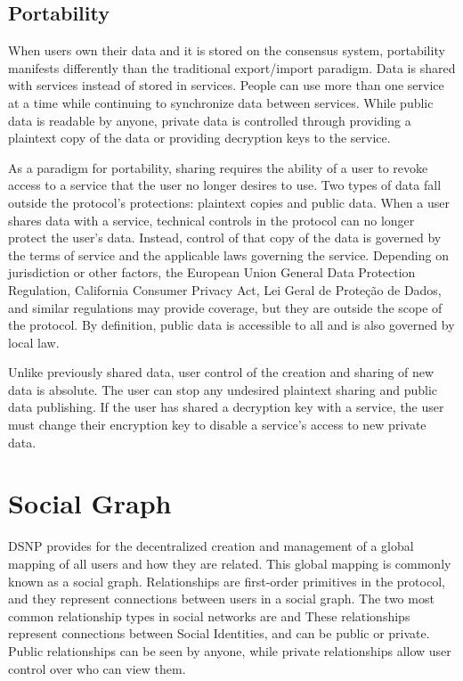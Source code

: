 \documentclass[12pt,letterpaper]{article}
\begin{document}
\subsection{Portability}\label{sec:portability}

When users own their data and it is stored on the consensus system, portability manifests
differently than the traditional export/import paradigm. Data is shared with services
instead of stored in services. People can use more than one service at a time while
continuing to synchronize data between services. While public data is readable by anyone,
private data is controlled through providing a plaintext copy of the data or providing
decryption keys to the service.

As a paradigm for portability, sharing requires the ability of a user to revoke access to a
service that the user no longer desires to use. Two types of data fall outside the
protocol's protections: plaintext copies and public data. When a user shares data with a
service, technical controls in the protocol can no longer protect the user's data.  Instead,
control of that copy of the data is governed by the terms of service and the applicable laws
governing the service. Depending on jurisdiction or other factors, the European Union
General Data Protection Regulation,\cite{gdpr2016} California Consumer Privacy
Act,\cite{ccpa2018} Lei Geral de Proteção de Dados,\cite{lgpd2019} and similar regulations
may provide coverage, but they are outside the scope of the protocol. By definition, public
data is accessible to all and is also governed by local law.

Unlike previously shared data, user control of the creation and sharing of new data is
absolute. The user can stop any undesired plaintext sharing and public data publishing. If
the user has shared a decryption key with a service, the user must change their encryption
key to disable a service's access to new private data.

\section{Social Graph}\label{sec:social_graph}

DSNP provides for the decentralized creation and management of a global mapping of all users
and how they are related. This global mapping is commonly known as a social graph.
Relationships are first-order primitives in the protocol, and they represent connections
between users in a social graph. The two most common relationship types in social networks
are  and  These relationships represent connections between Social
Identities, and can be public or private. Public relationships can be seen by anyone, while
private relationships allow user control over who can view them.
\end{document}
